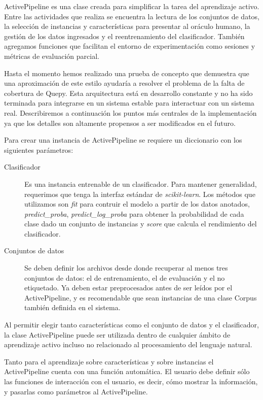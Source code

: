 ActivePipeline es una clase creada para simplificar la tarea del aprendizaje activo. Entre las actividades que realiza se encuentra la lectura de los conjuntos de datos, la selección de instancias y características para presentar al oráculo humano, la gestión de los datos ingresados y el reentrenamiento del clasificador. También agregamos funciones que facilitan el entorno de experimentación como sesiones y métricas de evaluación parcial.

Hasta el momento hemos realizado una prueba de concepto que demuestra que una aproximación de este estilo ayudaría a resolver el problema de la falta de cobertura de Quepy. Esta arquitectura está en desarrollo constante y no ha sido terminada para integrarse en un sistema estable para interactuar con un sistema real. Describiremos a continuación los puntos más centrales de la implementación ya que los detalles son altamente propensos a ser modificados en el futuro.

Para crear una instancia de ActivePipeline se requiere un diccionario con los siguientes parámetros:
\begin{description}
    \item[Clasificador] Es una instancia entrenable de un clasificador. Para mantener generalidad, requerimos que tenga la interfaz estándar de \textit{scikit-learn}. Los métodos que utilizamos son \textit{fit} para contruir el modelo a partir de los datos anotados, \textit{predict\_proba}, \textit{predict\_log\_proba} para obtener la probabilidad de cada clase dado un conjunto de instancias y \textit{score} que calcula el rendimiento del clasificador.
    \item[Conjuntos de datos] Se deben definir los archivos desde donde recuperar al menos tres conjuntos de datos: el de entrenamiento, el de evaluación y el no etiquetado. Ya deben estar preprocesados antes de ser leídos por el ActivePipeline, y es recomendable que sean instancias de una clase Corpus también definida en el sistema.
\end{description}

Al permitir elegir tanto características como el conjunto de datos y el clasificador, la clase ActivePipeline puede ser utilizada dentro de cualquier ámbito de aprendizaje activo incluso no relacionado al procesamiento del lenguaje natural.

Tanto para el aprendizaje sobre características y sobre instancias el ActivePipeline cuenta con una función automática. El usuario debe definir sólo las funciones de interacción con el usuario, es decir, cómo mostrar la información, y pasarlas como parámetros al ActivePipeline.

